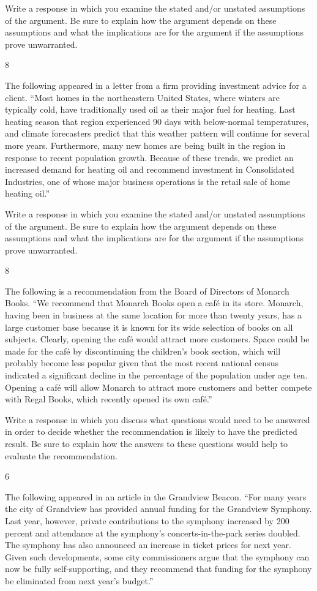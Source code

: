 \documentclass[]{article}
\begin{document}
Write a response in which you examine the stated and/or unstated
assumptions of the argument. Be sure to explain how the argument depends
on these assumptions and what the implications are for the argument if
the assumptions prove unwarranted.

8

The following appeared in a letter from a firm providing investment
advice for a client. ``Most homes in the northeastern United States,
where winters are typically cold, have traditionally used oil as their
major fuel for heating. Last heating season that region experienced 90
days with below-normal temperatures, and climate forecasters predict
that this weather pattern will continue for several more years.
Furthermore, many new homes are being built in the region in response to
recent population growth. Because of these trends, we predict an
increased demand for heating oil and recommend investment in
Consolidated Industries, one of whose major business operations is the
retail sale of home heating oil.''

Write a response in which you examine the stated and/or unstated
assumptions of the argument. Be sure to explain how the argument depends
on these assumptions and what the implications are for the argument if
the assumptions prove unwarranted.

8

The following is a recommendation from the Board of Directors of Monarch
Books. ``We recommend that Monarch Books open a café in its store.
Monarch, having been in business at the same location for more than
twenty years, has a large customer base because it is known for its wide
selection of books on all subjects. Clearly, opening the café would
attract more customers. Space could be made for the café by
discontinuing the children's book section, which will probably become
less popular given that the most recent national census indicated a
significant decline in the percentage of the population under age ten.
Opening a café will allow Monarch to attract more customers and better
compete with Regal Books, which recently opened its own café.''

Write a response in which you discuss what questions would need to be
answered in order to decide whether the recommendation is likely to have
the predicted result. Be sure to explain how the answers to these
questions would help to evaluate the recommendation.

6

The following appeared in an article in the Grandview Beacon. ``For many
years the city of Grandview has provided annual funding for the
Grandview Symphony. Last year, however, private contributions to the
symphony increased by 200 percent and attendance at the symphony's
concerts-in-the-park series doubled. The symphony has also announced an
increase in ticket prices for next year. Given such developments, some
city commissioners argue that the symphony can now be fully
self-supporting, and they recommend that funding for the symphony be
eliminated from next year's budget.''
\end{document}
